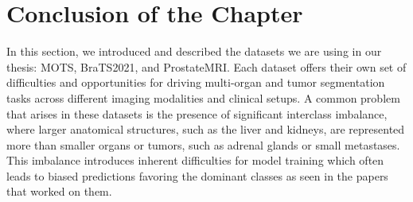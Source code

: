 \documentclass{cls/iutbscthesis}
\begin{document}




\section{Conclusion of the Chapter}

In this section, we introduced and described the datasets we are using in our thesis: MOTS, BraTS2021, and ProstateMRI. Each dataset offers their own set of difficulties and opportunities for driving multi-organ and tumor segmentation tasks across different imaging modalities and clinical setups. A common problem that arises in these datasets is the presence of significant interclass imbalance, where larger anatomical structures, such as the liver and kidneys, are represented more than smaller organs or tumors, such as adrenal glands or small metastases. This imbalance introduces inherent difficulties for model training which often leads to biased predictions favoring the dominant classes as seen in the papers that worked on them.
\end{document}
